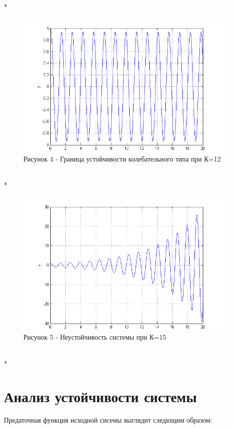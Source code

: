 \documentclass[a4paper, 12pt]{article}
\begin{document}
\hfill\\* 
\begin{figure}[h!]
	\centering
	\includegraphics[width = 1\textwidth]{3.png} \\
  \centering Рисунок 4 - Граница устойчивости колебательного типа при К=12
\end{figure} 
\hfill\\*
\begin{figure}[h!]
	\centering
	\includegraphics[width = 1\textwidth]{4.png} \\
  \centering Рисунок 5 - Неустойчивость системы при К=15
\end{figure} 
\hfill\\*
\newpage
\section*{ Анализ устойчивости системы}

Предаточная функция исходной сисемы выглядит следющим образом:
\end{document}
